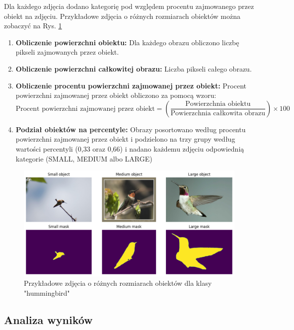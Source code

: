 Dla każdego zdjęcia dodano kategorię pod względem procentu zajmowanego przez obiekt na zdjęciu. Przykładowe zdjęcia o różnych 
rozmiarach obiektów można zobaczyć na Rys. \ref*{rys:size_comp}

\begin{enumerate}
    \item \textbf{Obliczenie powierzchni obiektu:} Dla każdego obrazu obliczono liczbę pikseli zajmowanych przez obiekt.
    \item \textbf{Obliczenie powierzchni całkowitej obrazu:} Liczba pikseli całego obrazu.
    \item \textbf{Obliczenie procentu powierzchni zajmowanej przez obiekt:} Procent powierzchni zajmowanej przez obiekt obliczono za pomocą wzoru:
    \begin{equation}
    \text{Procent powierzchni zajmowanej przez obiekt} = \left( \frac{\text{Powierzchnia obiektu}}{\text{Powierzchnia całkowita obrazu}} \right) \times 100
    \end{equation}
    \item \textbf{Podział obiektów na percentyle:} Obrazy posortowano według procentu powierzchni zajmowanej przez obiekt i 
    podzielono na trzy grupy według wartości percentyli (0,33 oraz 0,66) i nadano każdemu zdjęciu odpowiednią kategorie (SMALL, MEDIUM albo LARGE)
\end{enumerate}

\begin{figure}
	\centering\includegraphics[width=.9\textwidth]{img/size_comp}
	\caption{Przykładowe zdjęcia o różnych rozmiarach obiektów dla klasy "hummingbird"}  \label{rys:size_comp}
\end{figure}

\subsection*{Analiza wyników}

